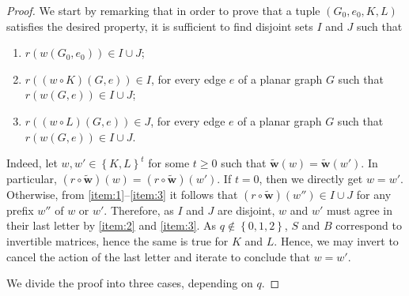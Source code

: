 \documentclass[10pt,a4paper]{amsart}
\newcommand{\set}[1]{\left\{ #1 \right\}}
\begin{document}
\begin{proof}


We start by remarking that in order to prove that a tuple $(G_0,e_0,K,L)$ satisfies the desired property, it is sufficient to find disjoint sets $I$ and $J$ such that \begin{enumerate}
    \item \label{item:1}$r(w(G_0,e_0)) \in I \cup J$;    \item\label{item:2}$r((w\circ K)(G,e))\in I$, for every edge $e$ of a planar graph $G$ such that $r(w(G,e)) \in I \cup J$;
    \item \label{item:3}$r((w\circ L)(G,e))\in J$, for every edge $e$ of a planar graph $G$ such that $r(w(G,e)) \in I \cup J$.
\end{enumerate}
Indeed, let $w, w' \in \set{K,L}^t$ for some $t \geq 0$ such that $\widetilde{\mathbf{w}}(w)= \widetilde{\mathbf{w}}(w')$. In particular, $(r \circ \widetilde{\mathbf{w}}) (w) = (r \circ \widetilde{\mathbf{w}})(w')$. If $ t= 0$, then we directly get $w = w'$. Otherwise, from \eqref{item:1}--\eqref{item:3} it follows that $(r\circ \widetilde{\mathbf{w}})(w'') \in I \cup J$ for any prefix $w''$ of $w$ or $w'$. Therefore, as $I$ and $J$ are disjoint, $w$ and $w'$ must agree in their last letter by \eqref{item:2} and \eqref{item:3}. As $q \not \in \set{0,1,2}$, $S$ and $B$ correspond to invertible matrices, hence the same is true for $K$ and $L$. Hence, we may invert to cancel the action of the last letter and iterate to conclude that $w = w'$.

We divide the proof into three cases, depending on $q$.


\end{proof}
\end{document}
